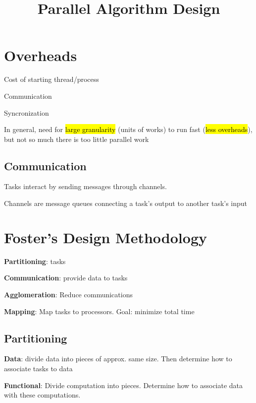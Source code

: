 \documentclass[12pt]{article}
\title{\textbf{Parallel Algorithm Design}}
\date{}
\begin{document}
\maketitle

\begin{spacing}{1.5}

\section{Overheads}

\begin{itemize*}
	\item Cost of starting thread/process
	\item Communication
	\item Syncronization
\end{itemize*}

In general, need for \hl{large granularity} (units of works) to run fast (\hl{less overheads}), but not so much there is too little parallel work

\subsection{Communication}

Tasks interact by sending messages through channels. 

Channels are message queues connecting a task's output to another task's input

\section{Foster's Design Methodology}

\begin{itemize*}
	\item \textbf{Partitioning}: tasks
	\item \textbf{Communication}: provide data to tasks
	\item \textbf{Agglomeration}: Reduce communications
	\item \textbf{Mapping}: Map tasks to processors. Goal: minimize total time
\end{itemize*}

\subsection{Partitioning}

\begin{itemize*}
	\item \textbf{Data}: divide data into pieces of approx. same size. Then determine how to associate tasks to data
	\item \textbf{Functional}: Divide computation into pieces. Determine how to associate data with these computations. 
\end{itemize*}


\end{spacing}
\end{document}
